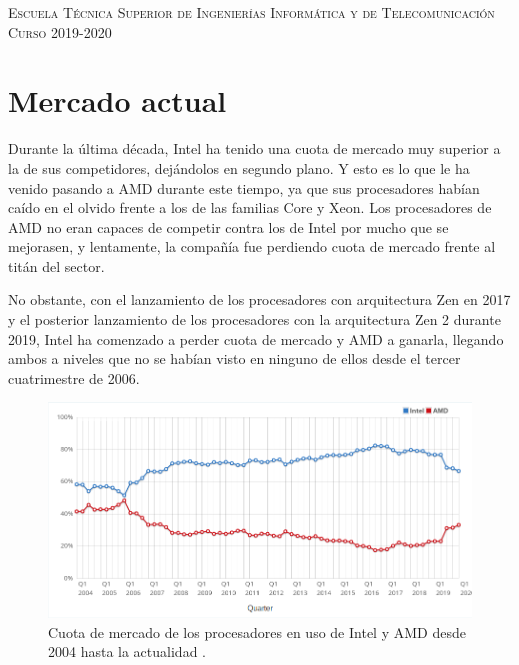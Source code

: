 \documentclass[11pt,a4paper]{article}
\begin{document}
\begin{titlepage}
\begin{minipage}{\textwidth}
\vspace{0.7cm}
\textsc{Escuela Técnica Superior de Ingenierías Informática y de Telecomunicación}\\
\vspace{1cm}
\textsc{Curso 2019-2020}
\end{minipage}
\end{titlepage}


\newpage

\setlength{\parskip}{1em}

\section*{Mercado actual}

Durante la última década, Intel ha tenido una cuota de mercado muy superior a la de sus
competidores, dejándolos en segundo plano. Y esto es lo que le ha venido pasando a AMD durante
este tiempo, ya que sus procesadores habían caído en el olvido frente a los de las familias Core y
Xeon. Los procesadores de AMD no eran capaces de competir contra los de Intel por mucho que se
mejorasen, y lentamente, la compañía fue perdiendo cuota de mercado frente al titán del sector.

No obstante, con el lanzamiento de los procesadores con arquitectura Zen en 2017 y el posterior
lanzamiento de los procesadores con la arquitectura Zen 2 durante 2019, Intel ha comenzado a
perder cuota de mercado y AMD a ganarla, llegando ambos a niveles que no se habían visto en
ninguno de ellos desde el tercer cuatrimestre de 2006.

\begin{figure}[H]
  \centering
  \includegraphics[scale=0.6]{img/cuota-mercado-intel-amd}
  \caption{Cuota de mercado de los procesadores en uso de Intel y AMD desde 2004 hasta la
  actualidad \cite{passmark}.}
\end{figure}
\end{document}
